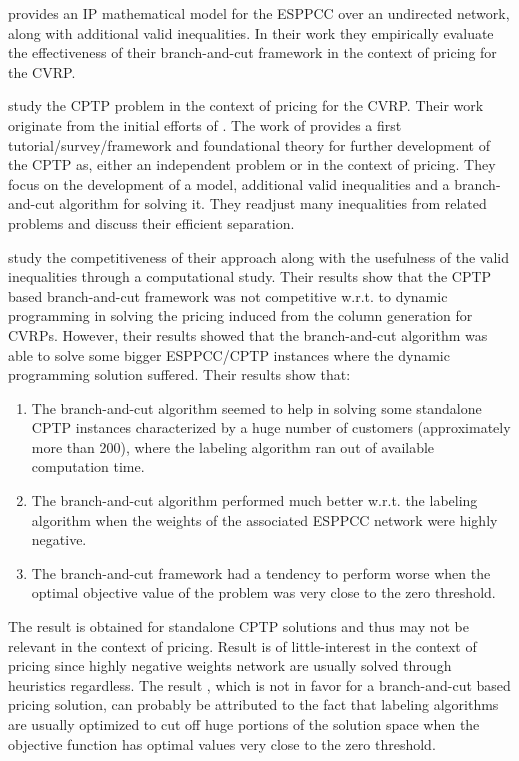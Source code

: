 \medskip

\textcite{jepsen2008branchandcut} provides an IP mathematical model
for the ESPPCC over an undirected network, along with additional valid inequalities.
In their work they empirically evaluate the effectiveness of their
branch-and-cut framework in the context of pricing for the CVRP.

\textcite{jepsen2014} study the CPTP problem in the context of pricing for the CVRP.
Their work originate from the initial efforts of \textcite{jepsen2008branchandcut}.
The work of \citeauthor{jepsen2014} provides a first tutorial/survey/framework
and foundational theory for further development of the CPTP as, either
an independent problem or in the context of pricing.
They focus on the development of a model, additional valid inequalities and
a branch-and-cut algorithm for solving it.
They readjust many inequalities from related problems
and discuss their efficient separation.

\textcite{jepsen2014} study the competitiveness of their approach
along with the usefulness of the valid inequalities through a computational study.
Their results show that the CPTP based branch-and-cut framework
was not competitive w.r.t. to dynamic programming
in solving the pricing induced from the column generation for CVRPs.
However, their results showed that the branch-and-cut algorithm
was able to solve some bigger ESPPCC/CPTP instances where the
dynamic programming solution suffered.
Their results show that:
\begin{enumerate}
	\setlength{\itemsep}{0pt}
	\setlength{\parskip}{0pt}

	\item \label{itm:cptp-branch-and-cut-better-p1} The branch-and-cut
	      algorithm seemed to help in solving some standalone CPTP instances characterized
	      by a huge number of customers (approximately more than 200),
	      where the labeling algorithm ran out of available computation time.
	\item \label{itm:cptp-branch-and-cut-better-p2} The branch-and-cut algorithm
	      performed much better w.r.t. the labeling algorithm when the
	      weights of the associated ESPPCC network were highly negative.
	\item \label{itm:cptp-branch-and-cut-better-p3} The branch-and-cut framework had a tendency
	      to perform worse when the optimal objective value of the problem was very close to the zero
	      threshold.
\end{enumerate}
The result  is obtained for standalone
CPTP solutions and thus may not be relevant in the context of pricing.
Result  is of little-interest
in the context of pricing
since highly negative weights network are usually solved through heuristics regardless.
The result , which is not in favor for a
branch-and-cut based pricing solution,
can probably be attributed to the fact that labeling algorithms
are usually optimized to cut off huge portions of the solution space when
the objective function has optimal values very close to the zero threshold.

